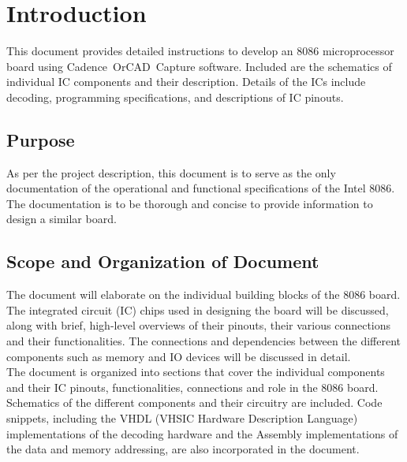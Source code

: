 \newpage
\section{Introduction}
This document provides detailed instructions to develop an 8086 microprocessor board using Cadence\textregistered \ OrCAD\textregistered \ Capture software. Included are the schematics of individual IC components and their description. Details of the ICs include decoding, programming specifications, and descriptions of IC pinouts.

    \subsection{Purpose}
    As per the project description, this document is to serve as the only documentation of the operational and functional specifications of the Intel 8086. The documentation is to be thorough and concise to provide information to design a similar board.

    \subsection{Scope and Organization of Document}
    The document will elaborate on the individual building blocks of the 8086 board. The integrated circuit (IC) chips used in designing the board will be discussed, along with brief, high-level overviews of their pinouts, their various connections and their functionalities. The connections and dependencies between the different components such as memory and IO devices will be discussed in detail.\\

    The document is organized into sections that cover the individual components and their IC pinouts, functionalities, connections and role in the 8086 board. Schematics of the different components and their circuitry are included. Code snippets, including the VHDL (VHSIC Hardware Description Language) implementations of the decoding hardware and the Assembly implementations of the data and memory addressing, are also incorporated in the document.
